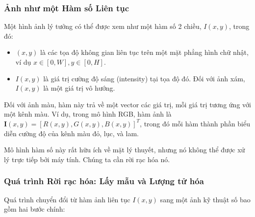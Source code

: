 \subsubsection{Ảnh như một Hàm số Liên tục}
\label{subsubsec:image_as_function}
Một hình ảnh lý tưởng có thể được xem như một hàm số 2 chiều, $I(x, y)$, trong đó:
\begin{itemize}
    \item $(x, y)$ là các tọa độ không gian liên tục trên một mặt phẳng hình chữ nhật, ví dụ $x \in [0, W], y \in [0, H]$.
    \item $I(x, y)$ là giá trị cường độ sáng (intensity) tại tọa độ đó. Đối với ảnh xám, $I(x, y)$ là một giá trị vô hướng.
\end{itemize}
Đối với ảnh màu, hàm này trả về một vector các giá trị, mỗi giá trị tương ứng với một kênh màu. Ví dụ, trong mô hình RGB, hàm ảnh là $\mathbf{I}(x, y) = [R(x, y), G(x, y), B(x, y)]^T$, trong đó mỗi hàm thành phần biểu diễn cường độ của kênh màu đỏ, lục, và lam.

Mô hình hàm số này rất hữu ích về mặt lý thuyết, nhưng nó không thể được xử lý trực tiếp bởi máy tính. Chúng ta cần rời rạc hóa nó.

\subsubsection{Quá trình Rời rạc hóa: Lấy mẫu và Lượng tử hóa}
\label{subsubsec:discretization}
Quá trình chuyển đổi từ hàm ảnh liên tục $I(x, y)$ sang một ảnh kỹ thuật số bao gồm hai bước chính:

